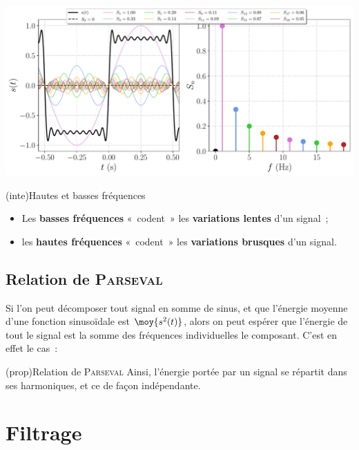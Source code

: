 \documentclass[../../main/main.tex]{subfiles}
\begin{document}
\begin{tcb}[breakable]
	\begin{minipage}{\linewidth}
		\centering
		\includegraphics[width=.85\linewidth]{fft_creneau}
		\vspace{-15pt}
	\end{minipage}
\end{tcb}

\begin{tcb}(inte){Hautes et basses fréquences}
	\begin{itemize}
		\item Les \textbf{basses fréquences} «~codent~» les \textbf{variations
			      lentes} d'un signal~;
		\item les \textbf{hautes fréquences} «~codent~» les \textbf{variations
			      brusques} d'un signal.
	\end{itemize}
\end{tcb}

\subsection{Relation de \textsc{Parseval}}
Si l'on peut décomposer tout signal en somme de sinus, et que l'énergie moyenne
d'une fonction sinusoïdale est $\moy{s^{2}(t)}$, alors on peut espérer que
l'énergie de tout le signal est la somme des fréquences individuelles  le
composant. C'est en effet le cas~:
\begin{tcb}(prop){Relation de \textsc{Parseval}}
	\psw{%
	\[
		\boxed{
		\moy{s^{2}(t)} = s^{2}\ind{eff} =
		S_0{}^{2} + \frac{1}{2} \sum_{n=1}^{+\infty} S_n{}^{2}
		}%
	\]
	}%
	Ainsi, l'énergie portée par un signal se répartit dans ses harmoniques, et ce
	de façon indépendante.
\end{tcb}

\section{Filtrage}
\end{document}
